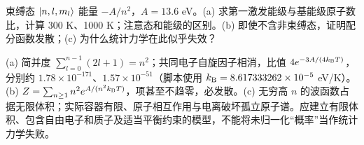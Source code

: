\begin{exercise}
束缚态 $\lvert n,l,m_l\rangle$ 能量 $-A/n^2$，$A=13.6$ eV。(a) 求第一激发能级与基能级原子数比，计算 300 K、1000 K；注意态和能级的区别。(b) 即使不含非束缚态，证明配分函数发散；(c) 为什么统计力学在此似乎失效？
\end{exercise}
\begin{solution}
(a) 简并度 $\sum_{l=0}^{n-1}(2l+1)=n^2$；共同电子自旋因子相消，比值 $4e^{-3A/(4k_{\mathrm B} T)}$，分别约 $1.78\times10^{-171}$、$1.57\times10^{-51}$（脚本使用 $k_{\mathrm B}=8.617333262\times10^{-5}$ eV/K）。(b) $Z=\sum_{n\ge1}n^2e^{A/(n^2k_{\mathrm B} T)}$，项甚至不趋零，必发散。(c) 无穷高 $n$ 的波函数占据无限体积；实际容器有限、原子相互作用与电离破坏孤立原子谱。应建立有限体积、包含自由电子和质子及适当平衡约束的模型，不能将未归一化“概率”当作统计力学失败。
\end{solution}
